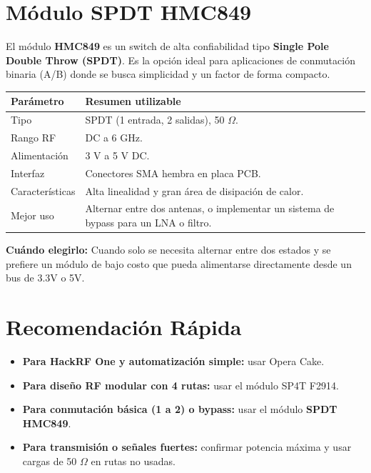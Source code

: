 \documentclass[11pt]{article}
\begin{document}
\section{Módulo SPDT HMC849}

El módulo \textbf{HMC849} es un switch de alta confiabilidad tipo \textbf{Single Pole Double Throw (SPDT)}. Es la opción ideal para aplicaciones de conmutación binaria (A/B) donde se busca simplicidad y un factor de forma compacto.

\begin{table}[h]
    \centering
    \small
    \begin{tabular}{p{}p{}}
        \toprule
        \textbf{Parámetro} & \textbf{Resumen utilizable} \\
        \midrule
        Tipo & SPDT (1 entrada, 2 salidas), 50 $\Omega$. \\
        Rango RF & DC a 6 GHz. \\
        Alimentación & 3 V a 5 V DC. \\
        Interfaz & Conectores SMA hembra en placa PCB. \\
        Características & Alta linealidad y gran área de disipación de calor. \\
        Mejor uso & Alternar entre dos antenas, o implementar un sistema de bypass para un LNA o filtro. \\
        \bottomrule
    \end{tabular}
\end{table}

\textbf{Cuándo elegirlo:} Cuando solo se necesita alternar entre dos estados y se prefiere un módulo de bajo costo que pueda alimentarse directamente desde un bus de 3.3V o 5V.

\section{Recomendación Rápida}

\begin{itemize}
    \item \textbf{Para HackRF One y automatización simple:} usar Opera Cake.
    \item \textbf{Para diseño RF modular con 4 rutas:} usar el módulo SP4T F2914.
    \item \textbf{Para conmutación básica (1 a 2) o bypass:} usar el módulo \textbf{SPDT HMC849}.
    \item \textbf{Para transmisión o señales fuertes:} confirmar potencia máxima y usar cargas de 50 $\Omega$ en rutas no usadas.
\end{itemize}
\end{document}
